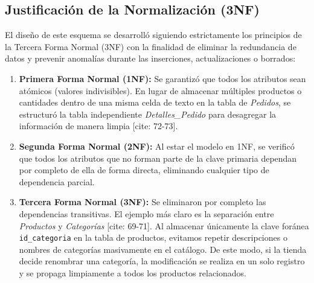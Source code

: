 \documentclass[11pt,a4paper]{article}
\begin{document}
\subsection{Justificación de la Normalización (3NF)}
El diseño de este esquema se desarrolló siguiendo estrictamente los principios de la Tercera Forma Normal (3NF) con la finalidad de eliminar la redundancia de datos y prevenir anomalías durante las inserciones, actualizaciones o borrados:
\begin{enumerate}
    \item \textbf{Primera Forma Normal (1NF):} Se garantizó que todos los atributos sean atómicos (valores indivisibles). En lugar de almacenar múltiples productos o cantidades dentro de una misma celda de texto en la tabla de \textit{Pedidos}, se estructuró la tabla independiente \textit{Detalles\_Pedido} para desagregar la información de manera limpia [cite: 72-73].
    \item \textbf{Segunda Forma Normal (2NF):} Al estar el modelo en 1NF, se verificó que todos los atributos que no forman parte de la clave primaria dependan por completo de ella de forma directa, eliminando cualquier tipo de dependencia parcial.
    \item \textbf{Tercera Forma Normal (3NF):} Se eliminaron por completo las dependencias transitivas. El ejemplo más claro es la separación entre \textit{Productos} y \textit{Categorías} [cite: 69-71]. Al almacenar únicamente la clave foránea \texttt{id\_categoria} en la tabla de productos, evitamos repetir descripciones o nombres de categorías masivamente en el catálogo. De este modo, si la tienda decide renombrar una categoría, la modificación se realiza en un solo registro y se propaga limpiamente a todos los productos relacionados.
\end{enumerate}
\end{document}
